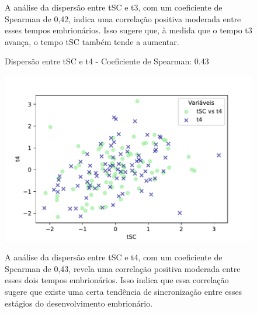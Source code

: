 \begin{figure}[h]
\begin{minipage}[b]{0.45\linewidth}
        \vspace{0.3cm}
        \caption{A análise da dispersão entre tSC e t3, com um coeficiente de Spearman de 0,42, indica uma correlação positiva moderada entre esses tempos embrionários. Isso sugere que, à medida que o tempo t3 avança, o tempo tSC também tende a aumentar.}
        \begin{minipage}{\linewidth}
            \centering
        \end{minipage}
    \end{minipage}
\end{figure}
\FloatBarrier

\begin{figure}[h]
    \captionsetup{font=footnotesize, justification=centering, labelsep=period, position=above}
    \centering
    \begin{minipage}[b]{0.45\linewidth}
        \caption{Dispersão entre tSC e t4 - Coeficiente de Spearman: 0.43}
        \label{fig:tSC-t4}
        \centering
        \includegraphics[scale=0.35]{figuras/Spearman/tSC-t4.pdf}
        \vspace{0.3cm}
        \caption{A análise da dispersão entre tSC e t4, com um coeficiente de Spearman de 0,43, revela uma correlação positiva moderada entre esses dois tempos embrionários. Isso indica que essa correlação sugere que existe uma certa tendência de sincronização entre esses estágios do desenvolvimento embrionário.}
        \begin{minipage}{\linewidth}
            \centering
        \end{minipage}
    \end{minipage}
    \hspace{0.05\linewidth}
    \begin{minipage}[b]{0.45\linewidth}

\end{minipage}
\end{figure}
